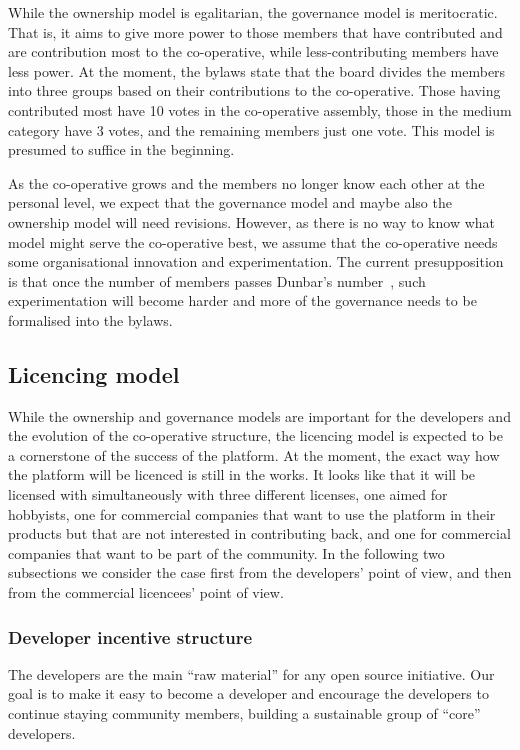 \documentclass[draft,a4paper]{siamltex}
\begin{document}
While the ownership model is egalitarian, the governance model is
meritocratic.  That is, it aims to give more power to those members
that have contributed and are contribution most to the co-operative,
while less-contributing members have less power.  At the moment, the
bylaws state that the board divides the members into three groups
based on their contributions to the co-operative.  Those having
contributed most have 10 votes in the co-operative assembly, those in
the medium category have 3 votes, and the remaining members just one
vote.  This model is presumed to suffice in the beginning.

As the co-operative grows and the members no longer know each other at
the personal level, we expect that the governance model and maybe also
the ownership model will need revisions.  However, as there is no way
to know what model might serve the co-operative best, we assume that
the co-operative needs some organisational innovation and
experimentation.  The current presupposition is that once the number
of members passes Dunbar's number~\cite{reference-needed}, such
experimentation will become harder and more of the governance needs to
be formalised into the bylaws.

\subsection{Licencing model}
\label{ssec:licencing}

While the ownership and governance models are important for the
developers and the evolution of the co-operative structure, the
licencing model is expected to be a cornerstone of the success of the
platform.  At the moment, the exact way how the platform will be
licenced is still in the works.  It looks like that it will be
licensed with simultaneously with three different licenses, one aimed
for hobbyists, one for commercial companies that want to use the
platform in their products but that are not interested in contributing
back, and one for commercial companies that want to be part of the
community.  In the following two subsections we consider the case
first from the developers' point of view, and then from the commercial
licencees' point of view.

\subsubsection{Developer incentive structure}

The developers are the main ``raw material'' for any open source
initiative.  Our goal is to make it easy to become a developer and
encourage the developers to continue staying community members,
building a sustainable group of ``core'' developers.
\end{document}
